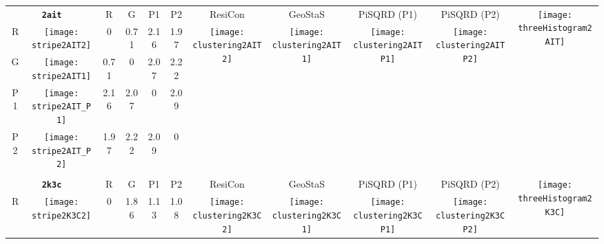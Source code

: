 \documentclass[a4paper,11pt,twoside]{book}%
\begin{document}
\begin{appendices}
\begin{sidewaystable}[h!]
\sffamily
\begin{tabular*}{4cm}{cc|c|c|c|c|c|c|c|c|c|}
\cline{1-11}
\multicolumn{2}{|c|}{{\bf \texttt{2ait}}} & R & G & P1 & P2 & ResiCon & GeoStaS & PiSQRD (P1) & PiSQRD (P2) & \multirow{5}{*}{\vspace{-0.15cm}\texttt{[image: threeHistogram2AIT]}}  \\
\cline{1-10}
\multicolumn{1}{|c|}{R} & \texttt{[image: stripe2AIT2]} & 0 & 0.71 & 2.16 & 1.97 & \multirow{4}{*}{\vspace{-0.3cm}\texttt{[image: clustering2AIT2]}} & \multirow{4}{*}{\vspace{-0.3cm}\texttt{[image: clustering2AIT1]}} & \multirow{4}{*}{\vspace{-0.3cm}\texttt{[image: clustering2AITP1]}} & \multirow{4}{*}{\vspace{-0.3cm}\texttt{[image: clustering2AITP2]}} &  \multirow{5}{*}{} \\
\cline{1-6}
\multicolumn{1}{|c|}{G} & \texttt{[image: stripe2AIT1]} & 0.71 & 0 & 2.07 & 2.22 & \multirow{4}{*}{} & \multirow{4}{*}{} & \multirow{4}{*}{} & \multirow{4}{*}{} & \multirow{5}{*}{} \\
\cline{1-6}
\multicolumn{1}{|c|}{P1} & \texttt{[image: stripe2AIT\_P1]} & 2.16 & 2.07 & 0 & 2.09 & \multirow{4}{*}{} & \multirow{4}{*}{} & \multirow{4}{*}{} & \multirow{4}{*}{} & \multirow{5}{*}{}  \\
\cline{1-6}
\multicolumn{1}{|c|}{P2} & \texttt{[image: stripe2AIT\_P2]} & 1.97 & 2.22 & 2.09 & 0 & \multirow{4}{*}{} & \multirow{4}{*}{} & \multirow{4}{*}{} & \multirow{4}{*}{} & \multirow{5}{*}{}  \\
\cline{1-11}
\\
\cline{1-11}
\multicolumn{2}{|c|}{{\bf \texttt{2k3c}}} & R & G & P1 & P2 & ResiCon & GeoStaS & PiSQRD (P1) & PiSQRD (P2) & \multirow{5}{*}{\vspace{-0.15cm}\texttt{[image: threeHistogram2K3C]}}  \\
\cline{1-10}
\multicolumn{1}{|c|}{R} & \texttt{[image: stripe2K3C2]} & 0 & 1.86 & 1.13 & 1.08 & \multirow{4}{*}{\vspace{-0.3cm}\texttt{[image: clustering2K3C2]}} & \multirow{4}{*}{\vspace{-0.3cm}\texttt{[image: clustering2K3C1]}} & \multirow{4}{*}{\vspace{-0.3cm}\texttt{[image: clustering2K3CP1]}} & \multirow{4}{*}{\vspace{-0.3cm}\texttt{[image: clustering2K3CP2]}} &  \multirow{5}{*}{} \\

\end{tabular*}
\end{sidewaystable}
\end{appendices}
\end{document}
